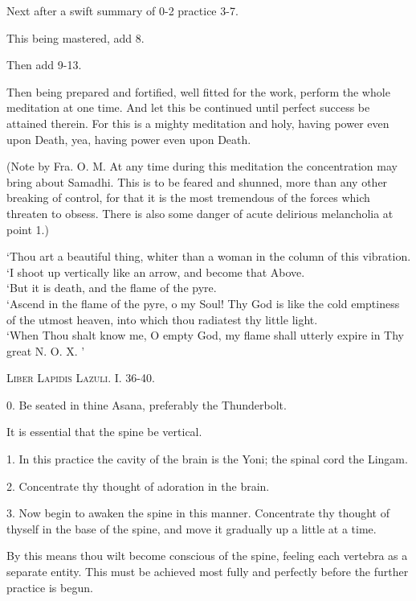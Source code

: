 Next after a swift summary of 0-2 practice 3-7.

This being mastered, add 8.

Then add 9-13.

Then being prepared and fortified, well fitted for the work, perform the whole meditation at one time. And let this be continued until perfect success be attained therein. For this is a mighty meditation and holy, having power even upon Death, yea, having power even upon Death.

(Note by Fra. O. M. At any time during this meditation the concentration may bring about Samadhi. This is to be feared and shunned, more than any other breaking of control, for that it is the most tremendous of the forces which threaten to obsess. There is also some danger of acute delirious melancholia at point 1.)


\pagebreak


\epigraph{
`Thou art a beautiful thing, whiter than a woman in the column of this vibration. \\
`I shoot up vertically like an arrow, and become that Above. \\
`But it is death, and the flame of the pyre. \\
`Ascend in the flame of the pyre, o my Soul! Thy God is like the cold emptiness of the utmost heaven, into which thou radiatest thy little light. \\
`When Thou shalt know me, O empty God, my flame shall utterly expire in Thy great N.\nolinebreak{} O.\nolinebreak{} X.\nolinebreak{} ' }{\textsc{Liber Lapidis Lazuli. I. 36-40.}}


0. Be seated in thine Asana, preferably the Thunderbolt.

It is essential that the spine be vertical.

1. In this practice the cavity of the brain is the Yoni; the spinal cord the Lingam.

2. Concentrate thy thought of adoration in the brain.

3. Now begin to awaken the spine in this manner. Concentrate thy thought of thyself in the base of the spine, and move it gradually up a little at a time.

By this means thou wilt become conscious of the spine, feeling each vertebra as a separate entity. This must be achieved most fully and perfectly before the further practice is begun.

